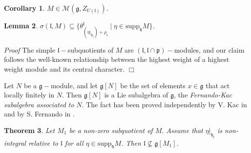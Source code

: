 \documentclass[default]{./styles/svmult}
\newtheorem{theo}{Theorem}[section]
\newtheorem{lem}[theo]{Lemma}
\newtheorem{cor}[theo]{Corollary}
\renewenvironment{proof}{ \emph{Proof}}{$\Box$}
\newcommand{\supp}{\mathrm{supp}}
\newcommand{\ch}{\mathrm{ch}}
\newcommand{\bb}{\mathfrak{b}}
\renewcommand{\gg}{\mathfrak{g}}
\newcommand{\hh}{\mathfrak{h}}
\renewcommand{\ll}{\mathfrak{l}}
\newcommand{\nn}{\mathfrak{n}}
\newcommand{\pp}{\mathfrak{p}}
\def\crplus{\hbox{$\supset${\raise1.05pt\hbox{\kern -0.55em ${\scriptscriptstyle +}$}}\ }}
\begin{document}
\begin{cor}\label{corr:1}
 $M \in \mathcal{M}(\gg, Z_{U(\ll)})$.
\end{cor}



\begin{lem}\label{lemma:4}
  $\sigma(\ll,M) \subseteq \lbrace\theta_{(\eta|_{\hh_{\ll}})+\rho_{\ll}}^{\ll}\;|\;\eta \in \supp_{\hh}M\rbrace$. 
\end{lem}

\begin{proof}
The simple $\ll-$subquotients of $M$ are $(\ll,\ll\cap\pp)-$modules, and our claim follows the well-known relationship between the highest weight of a highest weight module and its central character.
\end{proof}
\vspace{0.5cm}

Let $N$ be a $\gg-$module, and let $\gg[N]$ be the set of elements $x \in \gg$ that act locally finitely in $N$. Then $\gg[N]$ is a Lie subalgebra of $\gg$, the \textit{Fernando-Kac subalgebra associated to} $N$. The fact has been proved independently by V. Kac in \cite{K} and by S. Fernando in \cite{F}.

\begin{theo}\label{th:1}
 Let $M_1$ be a non-zero subquotient of $M$. Assume that $\eta|_{\hh_{\ll}}$ is non-integral relative to $\ll$ for all $\eta \in \supp_{\hh}M$. Then $\ll \nsubseteq \gg[M_1]$.
\end{theo}
\end{document}
